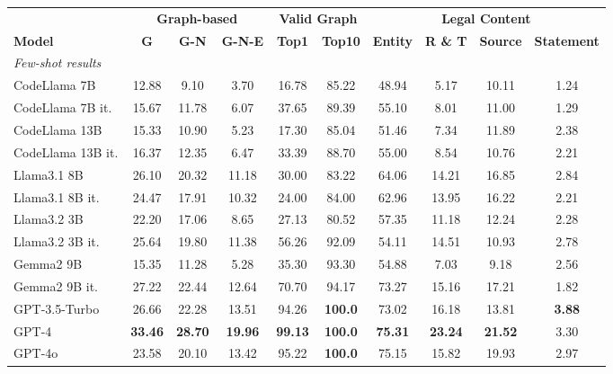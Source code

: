 \begin{table*}[t]
\centering
\footnotesize
\begin{tabular}{lccccccccc}
\toprule
    &\multicolumn{3}{c}{\textbf{Graph-based}}  & \multicolumn{2}{c}{\textbf{Valid Graph}} & \multicolumn{4}{c}{\textbf{Legal Content}} \\
    \cmidrule(lr){2-4} \cmidrule(lr){5-6} \cmidrule(lr){7-10}
\textbf{Model} &\textbf{G} & \textbf{G-N} & \textbf{G-N-E} & \textbf{Top1} & \textbf{Top10} & \textbf{Entity} & \textbf{R \& T} & \textbf{Source} & \textbf{Statement} \\
\midrule
\multicolumn{7}{l}{\textit{Few-shot results}} \\
CodeLlama 7B & 12.88 & 9.10 & 3.70 & 16.78 & 85.22 & 48.94 & 5.17 & 10.11 & 1.24\\
CodeLlama 7B it. &  15.67 & 11.78 & 6.07 &  37.65 & 89.39 & 55.10 & 8.01 & 11.00 & 1.29 \\
CodeLlama 13B & 15.33 & 10.90 & 5.23 & 17.30 & 85.04 & 51.46 & 7.34 & 11.89 & 2.38\\
CodeLlama 13B it. \hspace{-1em} & 16.37 & 12.35 & 6.47 & 33.39 & 88.70 & 55.00 & 8.54 & 10.76 & 2.21\\
Llama3.1 8B & 26.10 & 20.32 & 11.18 & 30.00 & 83.22 & 64.06 & 14.21 & 16.85 & 2.84\\
Llama3.1 8B it. \hspace{-1em} &  24.47 & 17.91 & 10.32 & 24.00 & 84.00& 62.96 & 13.95 & 16.22 & 2.21\\
Llama3.2 3B & 22.20 & 17.06 & 8.65 & 27.13 & 80.52& 57.35 & 11.18 & 12.24 & 2.28\\
Llama3.2 3B it. \hspace{-1em} &  25.64 & 19.80 & 11.38 & 56.26 & 92.09& 54.11 & 14.51 & 10.93 & 2.78\\
Gemma2 9B  & 15.35 & 11.28 & 5.28 & 35.30 & 93.30& 54.88 & 7.03 & 9.18 & 2.56\\
Gemma2 9B it. & 27.22 & 22.44 & 12.64 & 70.70 & 94.17 & 73.27 & 15.16 & 17.21 & 1.82\\
GPT-3.5-Turbo & 26.66 & 22.28 & 13.51 & 94.26 & \textbf{100.0} & 73.02 & 16.18 & 13.81 & \textbf{3.88}\\
GPT-4         & \textbf{33.46} & \textbf{28.70} & \textbf{19.96} & \textbf{99.13} & \textbf{100.0} & \textbf{75.31} & \textbf{23.24} & \textbf{21.52} & 3.30\\
GPT-4o        & 23.58 & 20.10 & 13.42 & 95.22 & \textbf{100.0} & 75.15 & 15.82 & 19.93 & 2.97\\

\end{tabular}
\end{table*}
